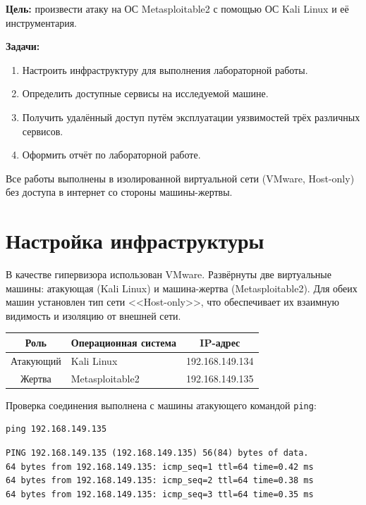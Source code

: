 \documentclass[a4paper,14pt]{extarticle}
\begin{document}
\textbf{Цель:} произвести атаку на ОС Metasploitable2 с помощью ОС Kali Linux и её инструментария.

\textbf{Задачи:}

\begin{enumerate}
\item Настроить инфраструктуру для выполнения лабораторной работы.
\item Определить доступные сервисы на исследуемой машине.
\item Получить удалённый доступ путём эксплуатации уязвимостей трёх различных сервисов.
\item Оформить отчёт по лабораторной работе.
\end{enumerate}

Все работы выполнены в изолированной виртуальной сети (VMware, Host-only) без доступа в интернет со стороны машины-жертвы.

\section{Настройка инфраструктуры}

В качестве гипервизора использован VMware. Развёрнуты две виртуальные машины: атакующая (Kali Linux) и машина-жертва (Metasploitable2). Для обеих машин установлен тип сети <<Host-only>>, что обеспечивает их взаимную видимость и изоляцию от внешней сети.

\begin{center}
\begin{tabularx}{\textwidth}{|c|X|c|}
\hline
\textbf{Роль} & \textbf{Операционная система} & \textbf{IP-адрес} \\
\hline
Атакующий & Kali Linux & 192.168.149.134 \\
\hline
Жертва & Metasploitable2 & 192.168.149.135 \\
\hline
\end{tabularx}
\end{center}

\vspace{3mm}
Проверка соединения выполнена с машины атакующего командой \texttt{ping}:

\begin{lstlisting}
ping 192.168.149.135
\end{lstlisting}

\begin{lstlisting}
PING 192.168.149.135 (192.168.149.135) 56(84) bytes of data.
64 bytes from 192.168.149.135: icmp_seq=1 ttl=64 time=0.42 ms
64 bytes from 192.168.149.135: icmp_seq=2 ttl=64 time=0.38 ms
64 bytes from 192.168.149.135: icmp_seq=3 ttl=64 time=0.35 ms
\end{lstlisting}
\end{document}
